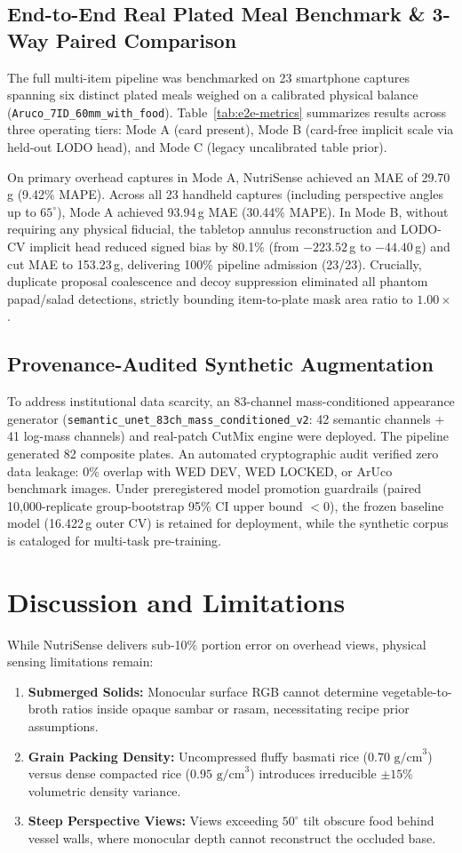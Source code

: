 \documentclass[conference]{IEEEtran}
\begin{document}
\subsection{End-to-End Real Plated Meal Benchmark \& 3-Way Paired Comparison}
The full multi-item pipeline was benchmarked on 23 smartphone captures spanning six distinct plated meals weighed on a calibrated physical balance (\texttt{Aruco\_7ID\_60mm\_with\_food}). Table~\ref{tab:e2e-metrics} summarizes results across three operating tiers: Mode A (card present), Mode B (card-free implicit scale via held-out LODO head), and Mode C (legacy uncalibrated table prior).

On primary overhead captures in Mode A, NutriSense achieved an MAE of 29.70\,g (9.42\% MAPE). Across all 23 handheld captures (including perspective angles up to $65^\circ$), Mode A achieved 93.94\,g MAE (30.44\% MAPE). In Mode B, without requiring any physical fiducial, the tabletop annulus reconstruction and LODO-CV implicit head reduced signed bias by 80.1\% (from $-223.52$\,g to $-44.40$\,g) and cut MAE to 153.23\,g, delivering 100\% pipeline admission (23/23). Crucially, duplicate proposal coalescence and decoy suppression eliminated all phantom papad/salad detections, strictly bounding item-to-plate mask area ratio to $1.00\times$.

\subsection{Provenance-Audited Synthetic Augmentation}
To address institutional data scarcity, an 83-channel mass-conditioned appearance generator (\texttt{semantic\_unet\_83ch\_mass\_conditioned\_v2}: 42 semantic channels + 41 log-mass channels) and real-patch CutMix engine were deployed. The pipeline generated 82 composite plates. An automated cryptographic audit verified zero data leakage: 0\% overlap with WED DEV, WED LOCKED, or ArUco benchmark images. Under preregistered model promotion guardrails (paired 10,000-replicate group-bootstrap 95\% CI upper bound $< 0$), the frozen baseline model (16.422\,g outer CV) is retained for deployment, while the synthetic corpus is cataloged for multi-task pre-training.

\section{Discussion and Limitations}
While NutriSense delivers sub-10\% portion error on overhead views, physical sensing limitations remain:
\begin{enumerate}
\item \textbf{Submerged Solids:} Monocular surface RGB cannot determine vegetable-to-broth ratios inside opaque sambar or rasam, necessitating recipe prior assumptions.
\item \textbf{Grain Packing Density:} Uncompressed fluffy basmati rice ($0.70\text{ g/cm}^3$) versus dense compacted rice ($0.95\text{ g/cm}^3$) introduces irreducible $\pm 15\%$ volumetric density variance.
\item \textbf{Steep Perspective Views:} Views exceeding $50^\circ$ tilt obscure food behind vessel walls, where monocular depth cannot reconstruct the occluded base.
\end{enumerate}
\end{document}
